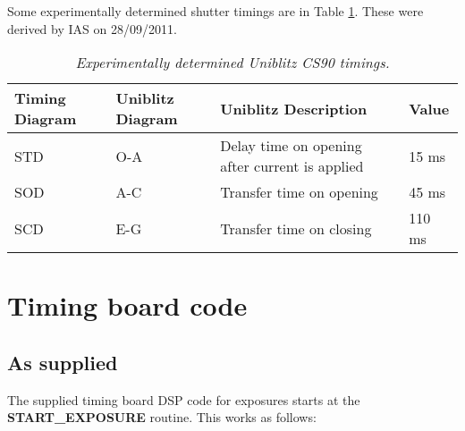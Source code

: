 \documentclass[10pt,a4paper]{article}
\begin{document}
Some experimentally determined shutter timings are in Table \ref{tab:experimenttime}. These were derived by IAS
on 28/09/2011.

\begin{table}[!h]
\begin{center}
\begin{tabular}{|l|l|p{15em}|l|}
\hline
{\bf Timing Diagram} & {\bf Uniblitz Diagram} & {\bf Uniblitz Description} & {\bf Value} \\ \hline
STD                  & O-A		      & Delay time on opening after current is applied & 15 ms \\ 
SOD                  & A-C                    & Transfer time on opening                       & 45 ms \\ 
SCD                  & E-G                    & Transfer time on closing                       & 110 ms \\ \hline
\end{tabular}
\end{center}
\caption{\em Experimentally determined Uniblitz CS90 timings.}
\label{tab:experimenttime}
\end{table}

\section{Timing board code}

\subsection{As supplied}

The supplied timing board DSP code for exposures starts at the {\bf START\_EXPOSURE} routine. This works as follows:
\end{document}
